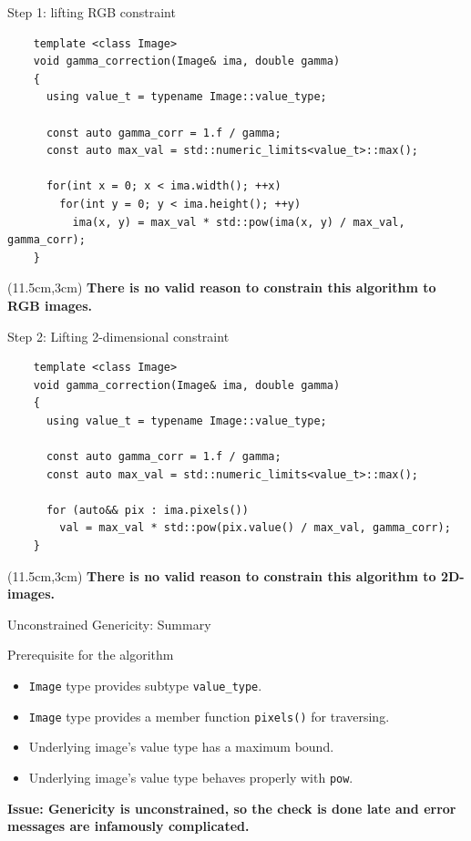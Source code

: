 \documentclass[12pt,aspectratio=169]{beamer}
\begin{document}
\begin{frame}[fragile]{Step 1:  lifting RGB constraint}
  \begin{verbatim}
    template <class Image>
    void gamma_correction(Image& ima, double gamma)
    {
      using value_t = typename Image::value_type;

      const auto gamma_corr = 1.f / gamma;
      const auto max_val = std::numeric_limits<value_t>::max();
    
      for(int x = 0; x < ima.width(); ++x)
        for(int y = 0; y < ima.height(); ++y)
          ima(x, y) = max_val * std::pow(ima(x, y) / max_val, gamma_corr);
    }
  \end{verbatim}
  \begin{textblock*}{4cm}(11.5cm,3cm)
    \textbf{There is no valid reason to constrain this algorithm to RGB images.}
  \end{textblock*}
\end{frame}

\begin{frame}[fragile]{Step 2: Lifting 2-dimensional constraint}
  \begin{verbatim}
    template <class Image>
    void gamma_correction(Image& ima, double gamma)
    {
      using value_t = typename Image::value_type;

      const auto gamma_corr = 1.f / gamma;
      const auto max_val = std::numeric_limits<value_t>::max();
    
      for (auto&& pix : ima.pixels())
        val = max_val * std::pow(pix.value() / max_val, gamma_corr);
    }
  \end{verbatim}
  \begin{textblock*}{4cm}(11.5cm,3cm)
    \textbf{There is no valid reason to constrain this algorithm to 2D-images.}
  \end{textblock*}
\end{frame}

\begin{frame}[fragile]{Unconstrained Genericity: Summary}
  \begin{alertblock}{Prerequisite for the algorithm}
    \begin{itemize}
      \item \texttt{Image} type provides subtype \texttt{value\_type}.
      \item \texttt{Image} type provides a member function \texttt{pixels()} for traversing.
      \item Underlying image's value type has a maximum bound.
      \item Underlying image's value type behaves properly with \texttt{pow}.
    \end{itemize}
  \end{alertblock}
  \textbf{Issue: Genericity is unconstrained, so the check is done late and error messages are infamously complicated.}
\end{frame}
\end{document}

